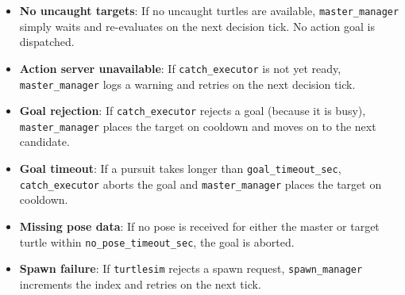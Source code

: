 \begin{itemize}
  \item \textbf{No uncaught targets}: If no uncaught turtles are available, \texttt{master\_manager} simply waits and re-evaluates on the next decision tick. No action goal is dispatched.

  \item \textbf{Action server unavailable}: If \texttt{catch\_executor} is not yet ready, \texttt{master\_manager} logs a warning and retries on the next decision tick.

  \item \textbf{Goal rejection}: If \texttt{catch\_executor} rejects a goal (because it is busy), \texttt{master\_manager} places the target on cooldown and moves on to the next candidate.

  \item \textbf{Goal timeout}: If a pursuit takes longer than \texttt{goal\_timeout\_sec}, \texttt{catch\_executor} aborts the goal and \texttt{master\_manager} places the target on cooldown.

  \item \textbf{Missing pose data}: If no pose is received for either the master or target turtle within \texttt{no\_pose\_timeout\_sec}, the goal is aborted.

  \item \textbf{Spawn failure}: If \texttt{turtlesim} rejects a spawn request, \texttt{spawn\_manager} increments the index and retries on the next tick.
\end{itemize}
